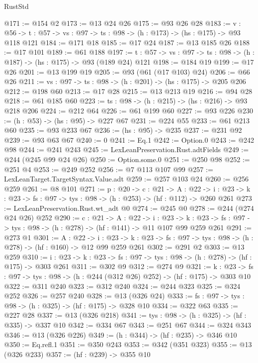 \begin{lexlean}{RustStd}
\begin{coremodule}
@171 := @154 @2
@173 := @13 @24 @26
@175 := @93 @26 @28
@183 := {v : @56} ->
  {t : @57} -> {vs : @97} -> {ts : @98} -> (h : @173) -> (hs : @175) -> @93 @118 @121
@184 := @171 @18
@185 := @17 @24
@187 := @13 @185 @26
@188 := @17 @101
@189 := @61 @188
@197 := {t : @57} -> {vs : @97} -> {ts : @98} -> (h : @187) -> (hs : @175) -> @93 (@189 @24) @121
@198 := @184 @19
@199 := @17 @26
@201 := @13 @199 @19
@205 := @93 (@61 (@17 @103) @24)
@206 := @66 @26
@211 := {vs : @97} -> {ts : @98} -> (h : @201) -> (hs : @175) -> @205 @206
@212 := @198 @60
@213 := @17 @28
@215 := @13 @213 @19
@216 := @94 @28
@218 := @61 @185 @60
@223 := {ts : @98} -> (h : @215) -> (hs : @216) -> @93 @218 @206
@224 := @212 @64
@226 := @61 @199 @60
@227 := @93 @226
@230 := (h : @53) -> (hs : @95) -> @227 @67
@231 := @224 @55
@233 := @61 @213 @60
@235 := @93 @233 @67
@236 := (hs : @95) -> @235
@237 := @231 @92
@239 := @93 @63 @67
@240 := 0
@241 := Eq.{1}
@242 := Option.{0}
@243 := @242 @98
@244 := @241 @243
@245 := LexLeanPreservation.Rust.adtFields
@249 := @244 (@245 @99 @24 @26)
@250 := Option.some.{0}
@251 := @250 @98
@252 := @251 @4
@253 := @249 @252
@256 := @7 @113 @107 @99
@257 := LexLeanTarget.TargetSyntax.Value.adt
@259 := @257 @103 @24
@260 := @256 @259
@261 := @8 @101
@271 := {p : @20} ->
  {c : @21} ->
  {A : @22} ->
  {i : @23} -> {k : @23} -> {fs : @97} -> {tys : @98} -> (h : @253) -> (hf : @112) -> @260 @261
@273 := LexLeanPreservation.Rust.wt_adt @0
@274 := @245 @0
@278 := @244 (@274 @24 @26) @252
@290 := {c : @21} ->
  {A : @22} ->
  {i : @23} ->
  {k : @23} -> {fs : @97} -> {tys : @98} -> (h : @278) -> (hf : @141) -> @11 @107 @99 @259 @261
@291 := @273 @1
@301 := {A : @22} ->
  {i : @23} ->
  {k : @23} -> {fs : @97} -> {tys : @98} -> (h : @278) -> (hf : @160) -> @12 @99 @259 @261
@302 := @291 @2
@303 := @13 @259
@310 := {i : @23} ->
  {k : @23} -> {fs : @97} -> {tys : @98} -> (h : @278) -> (hf : @175) -> @303 @261
@311 := @302 @9
@312 := @274 @9
@321 := {k : @23} ->
  {fs : @97} -> {tys : @98} -> (h : @244 (@312 @26) @252) -> (hf : @175) -> @303 @10
@322 := @311 @240
@323 := @312 @240
@324 := @244 @323
@325 := @324 @252
@326 := @257 @240
@328 := @13 (@326 @24)
@333 := {fs : @97} -> {tys : @98} -> (h : @325) -> (hf : @175) -> @328 @10
@334 := @322 @63
@335 := @227 @28
@337 := @13 (@326 @218)
@341 := {tys : @98} -> (h : @325) -> (hf : @335) -> @337 @10
@342 := @334 @67
@343 := @251 @67
@344 := @324 @343
@346 := @13 (@326 @226)
@349 := (h : @344) -> (hf : @235) -> @346 @10
@350 := Eq.refl.{1}
@351 := @350 @243
@353 := @342 (@351 @323)
@355 := @13 (@326 @233)
@357 := (hf : @239) -> @355 @10

\end{coremodule}
\end{lexlean}
